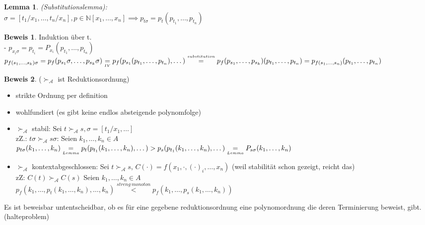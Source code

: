 \documentclass{article}
\newcommand\stackequal[2]{%
  \mathrel{\stackunder[2pt]{\stackon[4pt]{=}{$\scriptscriptstyle#1$}}{%
  $\scriptscriptstyle#2$}}
 }
\newcommand{\smallAscr}{\scriptscriptstyle\mathcal{A}}
\newtheorem{lemma}{Lemma}[section]
\theoremstyle{definition}
\newtheorem{beweis}{Beweis}[section]
\begin{document}
	\begin{lemma}(Substitutionslemma):\\
	$\sigma=[t_1/x_1,\dots,t_n/x_n], p\in\mathbb{N}[x_1,\dots,x_n]\implies p_{t\sigma} = p_t(p_{t_1},\dots,p_{t_n})$
	\end{lemma}
	\begin{beweis} Induktion über t.\\
	- $p_{x_i\sigma} = p_{t_i}=P_{x_i}(p_{t_1},\dots, p_{t_n})$\\
	$p_{f(s_1,\dots,s_k)\sigma} = p_f(p_{s_1}\sigma,\dots,p_{s_k}\sigma)\\
	\stackequal{}{IV} p_f(p_{s_1}(p_{t_1},\dots,p_{t_n}),\dots)\\
	\stackequal{substitution}{} p_f(p_{s_1},\dots,p_{s_k})(p_{t_1},\dots,p_{t_n})=p_{f(s_1,\dots,s_n)}(p_{t_1},\dots,p_{t_n})$
	\end{beweis}
	\begin{beweis} ($\succ_{\smallAscr}$ ist Reduktionsordnung)\\
	\begin{itemize}
	\item strikte Ordnung per definition
	\item wohlfundiert (es gibt keine endlos absteigende polynomfolge)
	\item $\succ_{\smallAscr}$ stabil: Sei $t\succ_{\smallAscr} s, \sigma=[t_1/x_1,\dots]$\\
	zZ.: $t\sigma\succ_{\smallAscr} s\sigma$: Seien $k_1,\dots, k_n\in A$\\
	$p_{t\sigma}(k_1,\dots,k_n)\stackequal{}{Lemma} p_t(p_{t_1}(k_1,\dots,k_n),\dots)>p_s(p_{t_1}(k_1,\dots,k_n),\dots)\stackequal{}{Lemma} P_{s\sigma}(k_1,\dots,k_n)$
	\item $\succ_{\smallAscr}$ kontextabgeschlossen: Sei $t\succ_{\smallAscr} s$, $C(\cdot)=f(x_1,\cdot,(\cdot)_i,\dots,x_n)$ (weil stabilität schon gezeigt, reicht das)\\
	zZ: $C(t)\succ_{\smallAscr} C(s)$ Seien $k_1,\dots, k_n\in A$\\
	$p_f(k_1,\dots,p_t(k_1,\dots,k_n),\dots,k_n)\stackrel{streng\ monoton}{<}p_f(k_1,\dots,p_s(k_1,\dots,k_n))$
	\end{itemize}
	\end{beweis}
	Es ist beweisbar untentscheidbar, ob es für eine gegebene reduktionsordnung eine polynomordnung die deren Terminierung beweist, gibt. (halteproblem)
\end{document}
